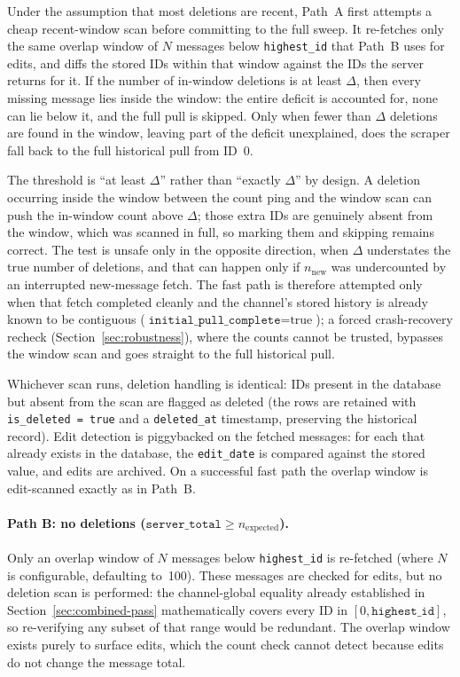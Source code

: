 Under the assumption that most deletions are recent, Path~A first attempts a cheap recent-window scan before committing to the full sweep. It re-fetches only the same overlap window of $N$ messages below \texttt{highest\_id} that Path~B uses for edits, and diffs the stored IDs within that window against the IDs the server returns for it. If the number of in-window deletions is at least $\Delta$, then every missing message lies inside the window: the entire deficit is accounted for, none can lie below it, and the full pull is skipped. Only when fewer than $\Delta$ deletions are found in the window, leaving part of the deficit unexplained, does the scraper fall back to the full historical pull from ID~0.

The threshold is ``at least $\Delta$'' rather than ``exactly $\Delta$'' by design. A deletion occurring inside the window between the count ping and the window scan can push the in-window count above $\Delta$; those extra IDs are genuinely absent from the window, which was scanned in full, so marking them and skipping remains correct. The test is unsafe only in the opposite direction, when $\Delta$ understates the true number of deletions, and that can happen only if $n_{\mathrm{new}}$ was undercounted by an interrupted new-message fetch. The fast path is therefore attempted only when that fetch completed cleanly and the channel's stored history is already known to be contiguous ($\texttt{initial\_pull\_complete} = \text{true}$); a forced crash-recovery recheck (Section~\ref{sec:robustness}), where the counts cannot be trusted, bypasses the window scan and goes straight to the full historical pull.

Whichever scan runs, deletion handling is identical: IDs present in the database but absent from the scan are flagged as deleted (the rows are retained with \texttt{is\_deleted = true} and a \texttt{deleted\_at} timestamp, preserving the historical record). Edit detection is piggybacked on the fetched messages: for each that already exists in the database, the \texttt{edit\_date} is compared against the stored value, and edits are archived. On a successful fast path the overlap window is edit-scanned exactly as in Path~B.

\paragraph{Path B: no deletions ($\texttt{server\_total} \geq n_{\mathrm{expected}}$).}
Only an overlap window of $N$ messages below \texttt{highest\_id} is re-fetched (where $N$ is configurable, defaulting to~100).
These messages are checked for edits, but no deletion scan is performed: the channel-global equality already established in Section~\ref{sec:combined-pass} mathematically covers every ID in $[0, \texttt{highest\_id}]$, so re-verifying any subset of that range would be redundant. The overlap window exists purely to surface edits, which the count check cannot detect because edits do not change the message total.

